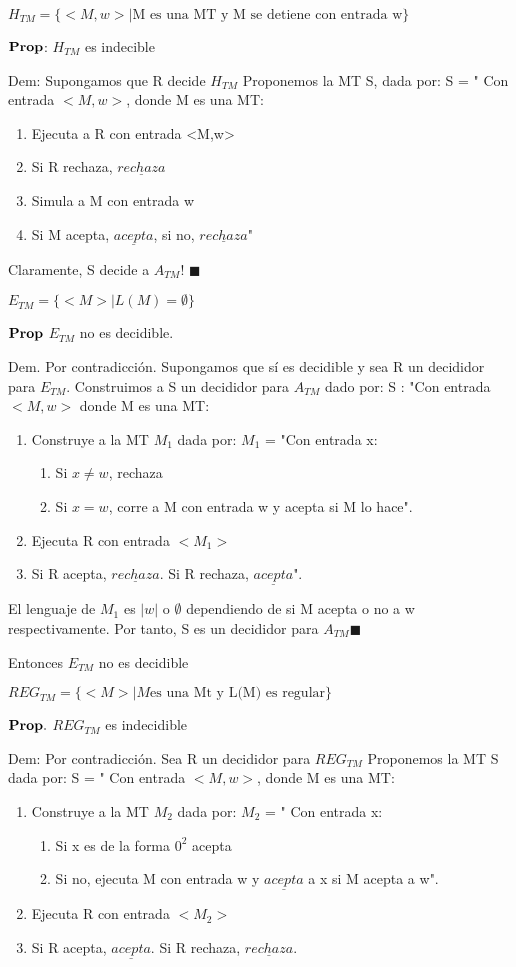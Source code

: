 \documentclass{homework}
\begin{document}
$H_{TM} = \{<M,w> | \text{M es una MT y M se detiene con entrada w}\}$

$\bf{Prop}$: $H_{TM}$ es indecible

Dem: Supongamos que R decide $H_{TM}$
Proponemos la MT S, dada por:
S = " Con entrada $<M,w>$, donde M es una MT:
\begin{enumerate}
	\item Ejecuta a R con entrada <M,w>
	\item Si R rechaza, $\underline{rechaza}$
	\item Simula a M con entrada w
	\item Si M acepta, $\underline{acepta}$, si no, $\underline{rechaza}$"
\end{enumerate}
Claramente, S decide a $A_{TM}$! $\blacksquare$


$E_{TM} = \{<M> | L(M) = \emptyset\}$

 $\bf{Prop}$ $E_{TM}$ no es decidible.
 
 Dem. Por contradicción. Supongamos que sí es decidible y sea R un decididor para $E_{TM}$. Construimos a S un decididor para $A_{TM}$ dado por:
 S : "Con entrada $<M,w>$ donde M es una MT:
 \begin{enumerate}
 	\item Construye a la MT $M_1$ dada por:
 	$M_1$ = "Con entrada x:
 	\begin{enumerate}
 		\item Si $x \neq w$, rechaza
 		\item  Si $x = w$, corre a M con entrada w y acepta si M lo hace".
 	\end{enumerate}
 	\item Ejecuta R con entrada $<M_1>$
 	\item Si R acepta, $\underline{rechaza}$. Si R rechaza, $\underline{acepta}$".
 \end{enumerate}

El lenguaje de $M_1$ es $|w|$ o $\emptyset$ dependiendo de si M acepta o no a w respectivamente. Por tanto, S es un decididor para $A_{TM} \blacksquare$


Entonces $E_{TM}$ no es decidible

$REG_{TM} = \{<M> | M \text{es una Mt y L(M) es regular}\}$

$\bf{Prop.}$ $REG_{TM}$ es indecidible

Dem: Por contradicción. Sea R un decididor para $REG_{TM}$
Proponemos la MT S dada por:
S = " Con entrada $<M,w>$, donde M es una MT:
\begin{enumerate}
	\item Construye a la MT $M_2$ dada por:
	$M_2$ = " Con entrada x:
	\begin{enumerate}
		\item Si x es de la forma $0^{2}$ acepta
		\item  Si no, ejecuta M con entrada w y $\underline{acepta}$ a x si M acepta a w".
	\end{enumerate}
	\item Ejecuta R con entrada $<M_2>$
	\item Si R acepta, $\underline{acepta}$. Si R rechaza, $\underline{rechaza}$.
\end{enumerate}
\end{document}
